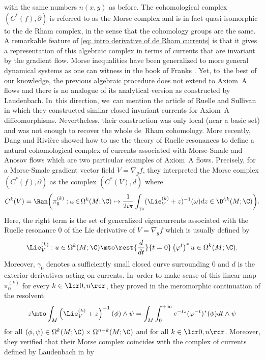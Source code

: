 with the same numbers $n(x,y)$ as before. The cohomological complex $(C^*(f),\partial)$ is referred to as the Morse complex and is in fact quasi-isomorphic to the de Rham complex, in the sense that the cohomology groups are the same. A remarkable feature of \eqref{eq: intro derivative of de Rham currents} is that it gives a representation of this algebraic complex in terms of currents that are invariant by the gradient flow. Morse inequalities have been generalized to more general dynamical systems as one can witness in the book of Franks \cite{franks_homology}. Yet, to~the best of our knowledge, the previous algebraic procedure does not extend to Axiom~A flows and there is no analogue of its analytical version as constructed by Laudenbach. In~this direction, we~can mention the article of Ruelle and Sullivan~\cite{ruelle-sullivan} in which they constructed similar closed invariant currents for Axiom~A diffeomorphisms. Nevertheless, their construction was only local (near a basic set) and was not enough to recover the whole de~Rham cohomology. More recently, Dang and Rivière showed how to use the theory of Ruelle resonances \cite{DR0} to define a natural cohomological complex of currents associated with Morse-Smale and Anosov flows which are two particular examples of Axiom~A flows. Precisely, for a Morse-Smale gradient vector field $V = \nabla_g f$, they interpreted the Morse complex $(C^* (f),\partial)$ as the complex $(C^* (V),d)$ where
\begin{equation}\label{eq: intro def Morse complex}
C^k (V) = \Ran \biggl(\pi_0^{(k)}: \omega \!\in\! \Omega^{k} (M; \C) \mapsto \frac{1}{2 i \pi} \int_{\gamma_0}(\Lie_{V}^{(k)} + z)^{-1} (\omega) dz \in \D'^{,k} (M;\C) \biggr).
\end{equation}
Here, the right term is the set of generalized eigencurrents associated with the Ruelle resonance $0$ of the Lie derivative of $V = \nabla_g f$ which is usually defined by
\[
\Lie_V^{(k)}: u \in \Omega^k (M;\C) \mto \rest{\frac{d}{dt}}{t= 0} \left(\varphi^t \right)^* u \in \Omega^k (M;\C).
\]
Moreover, $\gamma_0$ denotes a sufficiently small closed curve surrounding $0$ and $d$ is the exterior derivatives acting on currents. In~order to make sense of this linear map $\pi_0^{(k)}$ for every $k\in\lcr0,n\rcr$, they proved in \cite[Prop.\,4.2]{DR0} the meromorphic continuation of the resolvent
\[
z \mto \int_M \left(\Lie_{V}^{(k)} + z \right)^{-1} (\phi) \wedge \psi = \int_M \int_0^{+\infty} e^{-tz} (\varphi^{-t})^*(\phi) dt \wedge \psi
\]
for all $(\phi, \psi) \in \Omega^k (M;\C) \times \Omega^{n-k} (M;\C)$ and for all $k\in\lcr0,n\rcr$. Moreover, they verified that their Morse complex coincides with the complex of currents defined by Laudenbach in \cite{laudenbach} by
